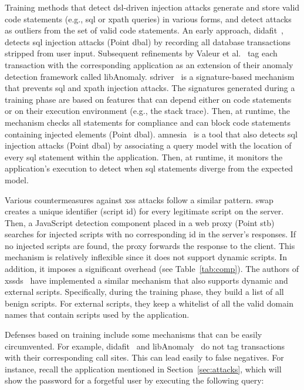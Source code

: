 \documentclass[10pt,journal,compsoc]{IEEEtran}
\begin{document}
Training methods that detect {\sc dsl}-driven injection attacks
generate and store valid code statements (e.g., {\sc sql} or {\sc
  xp}ath queries) in various forms, and detect attacks as outliers
from the set of valid code statements. An early approach,
{\sc didafit}~\cite{LLW02}, detects {\sc sql} injection attacks (Point
{\sc dbal}) by recording all database transactions
stripped from user input. Subsequent
refinements by Valeur et al.~\cite{VMV05} tag each transaction with
the corresponding application as an extension of their anomaly
detection framework called libAnomaly.
{\sc sd}river~\cite{MS09,MKLS11} is a signature-based mechanism
that prevents {\sc sql} and {\sc xp}ath injection attacks. The
signatures generated during a training phase are based on features
that can depend either on code statements or on their execution
environment (e.g., the stack trace). Then, at runtime, the mechanism
checks all statements for compliance and can block code statements
containing injected elements (Point {\sc dbal}).
{\sc amnesia}~\cite{HO05b} is a tool that also detects
{\sc sql} injection attacks (Point {\sc dbal}) by associating a query model
with the location of every {\sc sql} statement within the application.
Then, at runtime, it monitors the application's execution to detect
when {\sc sql} statements diverge from the expected model.

Various countermeasures against {\sc xss} attacks follow a similar
pattern. {\sc swap}~\cite{WPLKK09} creates a unique identifier
(script {\sc id}) for every legitimate script on the server.
Then, a JavaScript detection component placed in a web proxy (Point
{\sc s}t{\sc b}) searches for injected scripts with no corresponding {\sc id}
in the server's responses. If no injected scripts are found, the proxy
forwards the response to the client. This mechanism is relatively
inflexible since it does not support dynamic scripts. In addition, it
imposes a significant overhead (see Table~\ref{tab:comp}). The authors
of {\sc xssds}~\cite{JEP08} have implemented a similar mechanism
that also supports dynamic and external scripts. Specifically, during the
training phase, they build a list of all benign scripts. For
external scripts, they keep a whitelist of all the valid domain names
that contain scripts used by the application.

Defenses based on training include some mechanisms that can be easily
circumvented. For example, {\sc didafit}~\cite{LLW02}
and libAnomaly~\cite{VMV05} do not tag transactions with their
corresponding call sites. This can lead
easily to false negatives. For instance, recall the application
mentioned in Section~\ref{sec:attacks}, which will show the password
for a forgetful user by executing the following query:
\end{document}
